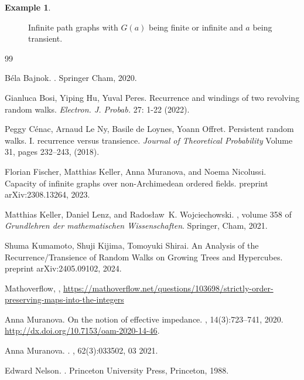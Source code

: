 \documentclass[a4paper,oneside, 12pt]{amsart}
\numberwithin{theorem}{section}
\theoremstyle{definition}
\newtheorem{example}[theorem]{Example}
\newcommand{\G}{{G}}
\begin{document}
{\begin{example}
\begin{figure}[H]
\begin{tikzpicture}[auto,node distance=1.5cm,
                    thick,main node/.style={circle, draw, fill=black!100,
                        inner sep=0pt, minimum width=3pt}]
\end{tikzpicture}
\caption{Infinite path graphs with $ \G(a) $ being finite or infinite and $ a $ being transient.}
\label{Fig1inf}
\end{figure}
\end{example}

\begin{thebibliography}{99}

Béla Bajnok.
.
\newblock Springer Cham, 2020.

 Gianluca Bosi, Yiping Hu, Yuval Peres. {Recurrence and windings of two revolving random walks}. {\em Electron. J. Probab.} 27: 1-22 (2022).

Peggy Cénac, Arnaud Le Ny, Basile de Loynes, Yoann Offret. {Persistent random walks. I. recurrence versus transience}. {\em Journal of Theoretical Probability} Volume 31, pages 232–243, (2018).

Florian Fischer, Matthias Keller, Anna Muranova,  and Noema Nicolussi. 
\newblock Capacity of infinite graphs over non-Archimedean ordered fields. \newblock
 preprint arXiv:2308.13264,  2023.




Matthias Keller, Daniel Lenz, and Rados\l aw~K. Wojciechowski.
, volume 358 of {\em
  Grundlehren der mathematischen Wissenschaften}.
\newblock Springer, Cham,  2021.


Shuma Kumamoto, Shuji Kijima, Tomoyuki Shirai. \newblock An Analysis of the Recurrence/Transience of Random Walks on Growing Trees and Hypercubes. \newblock
 preprint arXiv:2405.09102,  2024.

 Mathoverflow, , 
\newblock \url{https://mathoverflow.net/questions/103698/strictly-order-preserving-maps-into-the-integers}

Anna Muranova.
\newblock On the notion of effective impedance.
, 14(3):723--741, 2020.
\newblock \url{http://dx.doi.org/10.7153/oam-2020-14-46}.


Anna Muranova.
.
, 62(3):033502, 03 2021.

Edward Nelson.
.
\newblock Princeton University Press, Princeton, 1988.


\end{thebibliography}}
\end{document}
